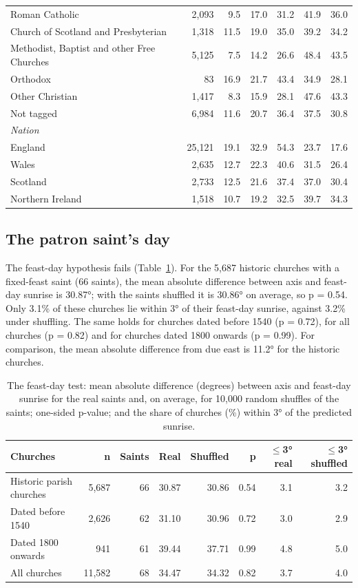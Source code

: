 \documentclass[11pt,a4paper]{article}
\begin{document}
\begin{table}[tbp]
\begin{tabular}{lrrrrrr}
Roman Catholic & 2,093 & 9.5 & 17.0 & 31.2 & 41.9 & 36.0\\
Church of Scotland and Presbyterian & 1,318 & 11.5 & 19.0 & 35.0 & 39.2 & 34.2\\
Methodist, Baptist and other Free Churches & 5,125 & 7.5 & 14.2 & 26.6 & 48.4 & 43.5\\
Orthodox & 83 & 16.9 & 21.7 & 43.4 & 34.9 & 28.1\\
Other Christian & 1,417 & 8.3 & 15.9 & 28.1 & 47.6 & 43.3\\
Not tagged & 6,984 & 11.6 & 20.7 & 36.4 & 37.5 & 30.8\\
\midrule\multicolumn{7}{l}{\textit{Nation}}\\
England & 25,121 & 19.1 & 32.9 & 54.3 & 23.7 & 17.6\\
Wales & 2,635 & 12.7 & 22.3 & 40.6 & 31.5 & 26.4\\
Scotland & 2,733 & 12.5 & 21.6 & 37.4 & 37.0 & 30.4\\
Northern Ireland & 1,518 & 10.7 & 19.2 & 32.5 & 39.7 & 34.3\\
\bottomrule\end{tabular}\end{table}

\subsection{The patron saint's day}
The feast-day hypothesis fails (Table~\ref{tab:feast}). For the 5,687 historic churches with a fixed-feast saint (66 saints), the mean absolute difference between axis and feast-day sunrise is 30.87°; with the saints shuffled it is 30.86° on average, so p = 0.54. Only 3.1\% of these churches lie within 3° of their feast-day sunrise, against 3.2\% under shuffling. The same holds for churches dated before 1540 (p = 0.72), for all churches (p = 0.82) and for churches dated 1800 onwards (p = 0.99). For comparison, the mean absolute difference from due east is 11.2° for the historic churches.

\begin{table}[tbp]\centering\small\caption{The feast-day test: mean absolute difference (degrees) between axis and feast-day sunrise for the real saints and, on average, for 10,000 random shuffles of the saints; one-sided p-value; and the share of churches (\%) within 3° of the predicted sunrise.}\label{tab:feast}
\begin{tabular}{lrrrrrrr}\toprule Churches & n & Saints & Real & Shuffled & p & $\le$3° real & $\le$3° shuffled\\\midrule
Historic parish churches & 5,687 & 66 & 30.87 & 30.86 & 0.54 & 3.1 & 3.2\\
Dated before 1540 & 2,626 & 62 & 31.10 & 30.96 & 0.72 & 3.0 & 2.9\\
Dated 1800 onwards & 941 & 61 & 39.44 & 37.71 & 0.99 & 4.8 & 5.0\\
All churches & 11,582 & 68 & 34.47 & 34.32 & 0.82 & 3.7 & 4.0\\
\bottomrule\end{tabular}\end{table}
\end{document}
